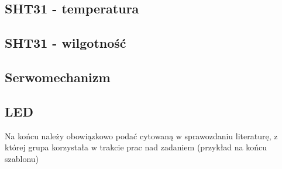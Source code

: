 \documentclass{classrep}
\begin{document}
\subsection {SHT31 - temperatura}
\subsection {SHT31 - wilgotność}
\subsection {Serwomechanizm}
\subsection {LED}

\begin{thebibliography}{0}
\end{thebibliography}
{\color{blue} 
Na końcu należy obowiązkowo podać cytowaną w sprawozdaniu
literaturę, z której grupa korzystała w trakcie prac nad zadaniem (przykład na
końcu szablonu)}
\end{document}
